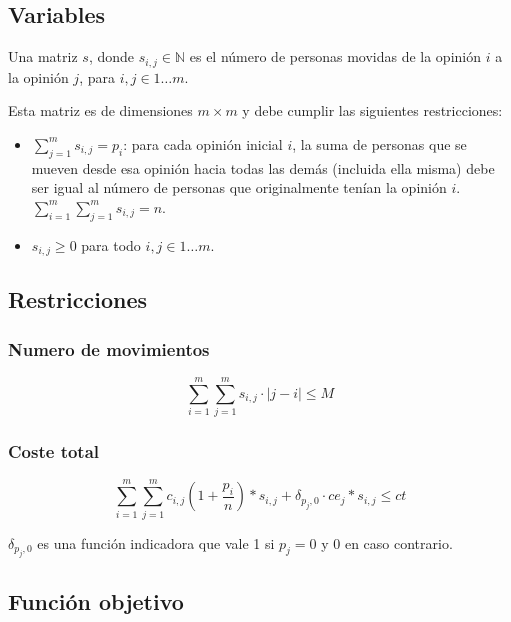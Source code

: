 \subsection{Variables}

Una matriz $s$, donde $s_{ i,j } \in \mathbb{ N }$ es el número de personas movidas de la opinión $i$ a la opinión $j$, para $i,j \in 1 \dots m$.

Esta matriz es de dimensiones $m \times m$ y debe cumplir las siguientes restricciones:

\begin{itemize}
	\item $\sum_{ j = 1 }^m s_{ i,j } = p_i$: para cada opinión inicial $i$, la suma de personas que se mueven desde esa opinión hacia todas las demás (incluida ella misma) debe ser igual al número de personas que originalmente tenían la opinión $i$. $\sum_{ i = 1 }^m \sum_{ j = 1 }^m s_{ i,j } = n$.

	\item $s_{ i,j } \geq 0$ para todo $i,j \in 1 \dots m$.
\end{itemize}

\subsection{Restricciones}

\subsubsection{Numero de movimientos}

\begin{equation}
	\sum_{ i = 1 }^m \sum_{ j = 1 }^m s_{ i,j } \cdot |j-i| \leq M
\end{equation}

\subsubsection{Coste total}

\begin{equation}
	\sum_{ i = 1 }^m \sum_{ j = 1 }^m c_{ i,j } \left (1 + \frac{ p_i }{ n } \right ) * s_{ i,j } + \delta_{ p_j, 0 } \cdot ce_j * s_{ i,j } \leq ct
\end{equation}

$\delta_{ p_j, 0 }$ es una función indicadora que vale 1 si $p_j = 0$ y 0 en caso contrario.

\subsection{Función objetivo}

